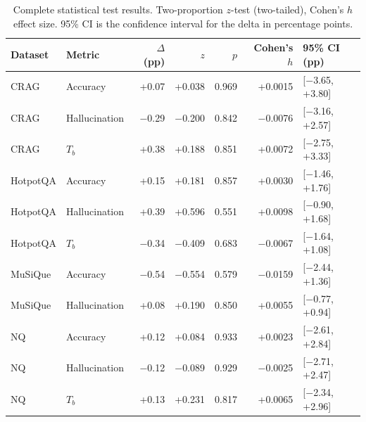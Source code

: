 \documentclass[11pt]{article}
\begin{document}
\begin{table}[h]
\centering
\caption{Complete statistical test results. Two-proportion $z$-test (two-tailed), Cohen's $h$ effect size. 95\% CI is the confidence interval for the delta in percentage points.}
\label{tab:stats_full}
\begin{tabular}{llrrrrl}
\toprule
\textbf{Dataset} & \textbf{Metric} & \textbf{$\Delta$ (pp)} & \textbf{$z$} & \textbf{$p$} & \textbf{Cohen's $h$} & \textbf{95\% CI (pp)} \\
\midrule
CRAG & Accuracy & +0.07 & +0.038 & 0.969 & +0.0015 & [$-$3.65, +3.80] \\
CRAG & Hallucination & $-$0.29 & $-$0.200 & 0.842 & $-$0.0076 & [$-$3.16, +2.57] \\
CRAG & $T_b$ & +0.38 & +0.188 & 0.851 & +0.0072 & [$-$2.75, +3.33] \\
HotpotQA & Accuracy & +0.15 & +0.181 & 0.857 & +0.0030 & [$-$1.46, +1.76] \\
HotpotQA & Hallucination & +0.39 & +0.596 & 0.551 & +0.0098 & [$-$0.90, +1.68] \\
HotpotQA & $T_b$ & $-$0.34 & $-$0.409 & 0.683 & $-$0.0067 & [$-$1.64, +1.08] \\
MuSiQue & Accuracy & $-$0.54 & $-$0.554 & 0.579 & $-$0.0159 & [$-$2.44, +1.36] \\
MuSiQue & Hallucination & +0.08 & +0.190 & 0.850 & +0.0055 & [$-$0.77, +0.94] \\
NQ & Accuracy & +0.12 & +0.084 & 0.933 & +0.0023 & [$-$2.61, +2.84] \\
NQ & Hallucination & $-$0.12 & $-$0.089 & 0.929 & $-$0.0025 & [$-$2.71, +2.47] \\
NQ & $T_b$ & +0.13 & +0.231 & 0.817 & +0.0065 & [$-$2.34, +2.96] \\
\bottomrule
\end{tabular}
\end{table}
\end{document}
